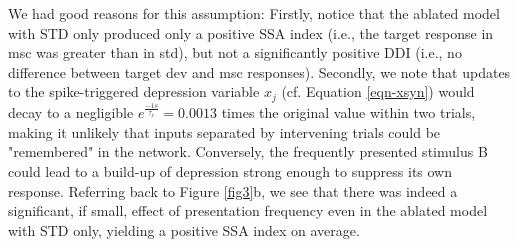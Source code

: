 \documentclass[pdflatex,referee,iicol,sn-basic]{sn-jnl}
\theoremstyle{thmstyleone}%
\theoremstyle{thmstyletwo}%
\theoremstyle{thmstylethree}%
\begin{document}
We had good reasons for this assumption: Firstly, notice that the ablated model with STD only produced only a positive SSA index (i.e., the target response in msc was greater than in std), but not a significantly positive DDI (i.e., no difference between target dev and msc responses). Secondly, we note that updates to the spike-triggered depression variable $x_j$ (cf. Equation \ref{eqn-xsyn}) would decay to a negligible $e^\frac{-1 s}{\tau_x} = 0.0013$ times the original value within two trials, making it unlikely that inputs separated by intervening trials could be "remembered" in the network. Conversely, the frequently presented stimulus B could lead to a build-up of depression strong enough to suppress its own response. Referring back to Figure \ref{fig3}b, we see that there was indeed a significant, if small, effect of presentation frequency even in the ablated model with STD only, yielding a positive SSA index on average.
\end{document}
